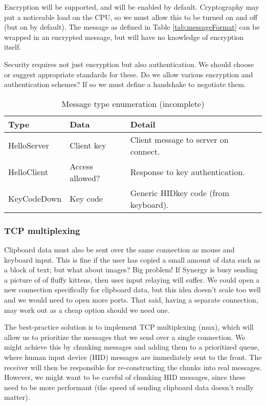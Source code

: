 Encryption will be supported, and will be enabled by default. Cryptography may 
put a noticeable load on the CPU, so we must allow this to be turned on and off
(but on by default). The message as defined in Table \ref{tab:messageFormat}
can be wrapped in an encrypted message, but will have no knowledge of encryption
itself.

Security requires not just encryption but also authentication. We should choose
or suggest appropriate standards for these. Do we allow various encryption and
authentication schemes? If so we must define a handshake to negotiate them.

\begin{table}[ht!]
  \begin{tabular}{|l|l|l|}
    \hline
    \textbf{Type} &
    \textbf{Data} &
    \textbf{Detail} \\
    \hline
    HelloServer & Client key & Client message to server on connect. \\
    HelloClient & Access allowed? & Response to key authentication. \\
    KeyCodeDown & Key code & Generic HID\footnotemark key code (from 
    keyboard). \\
    \hline
  \end{tabular}
  \caption{Message type enumeration (incomplete)}
  \label{tab:messageTypes}
\end{table}


\subsubsection{TCP multiplexing}

Clipboard data must also be sent over the same connection as mouse and
keyboard input. This is fine if the user has copied a small amount of data
such as a block of text; but what about images? Big problem! If Synergy is busy
sending a picture of of fluffy kittens, then user input relaying will suffer.
We could open a new connection specifically for clipboard data, but this idea
doesn't scale too well and we would need to open more ports. That said, having
a separate connection, may work out as a cheap option should we need one.

The best-practice solution is to implement TCP multiplexing (mux), which will 
allow us to prioritize the messages that we send over a single connection. We
might achieve this by chunking messages and adding them to a prioritized queue,
where human input device (HID) messages are immediately sent to the front. The
receiver will then be responsible for re-constructing the chunks into real 
messages. However, we might want to be careful of chunking HID messages, since 
these need to be more performant (the speed of sending clipboard data doesn't 
really matter).


